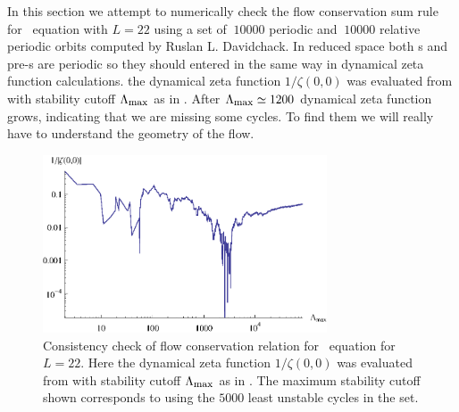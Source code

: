 In this section we attempt to numerically check the
flow conservation sum rule  for \KS\ equation with $L=22$ 
using a set of $~10000$ periodic and $~10000$ relative
periodic orbits  computed by Ruslan L. Davidchack.
In reduced space both \rpo s and pre-\po s are periodic so they should
entered in the same way in dynamical zeta function calculations. the dynamical zeta function $1/\zeta(0,0)$ was evaluated
from  with stability cutoff $\Lambda_{\mbox{\footnotesize max}}$ as
in . After $\Lambda_{\mbox{\footnotesize max}}\simeq1200$
dynamical zeta function grows, indicating that we are missing some cycles.
To find them we will really have to understand the geometry of the flow.

\begin{figure}
    \vspace*{-5pt}
\begin{center}
	\includegraphics[width=0.75\textwidth]{../figs/ksStabOrder5000}
\end{center}
\caption[flow conservation relation for KSe, $L=22$]
    {
Consistency check of flow conservation relation 
for \KS\ equation  for $L=22$.
Here the dynamical zeta function $1/\zeta(0,0)$ was evaluated
from  with stability cutoff $\Lambda_{\mbox{\footnotesize max}}$ as
in . The maximum stability cutoff shown corresponds
to using the $5000$ least unstable cycles in the set.
	}
\label{fig:zetaStabOrderKS22}
    \vspace*{-5pt}
\end{figure}



